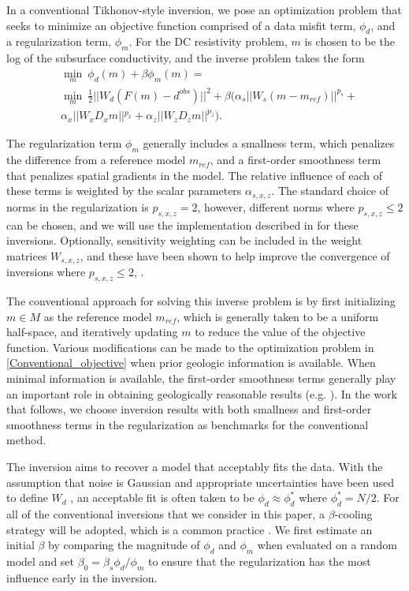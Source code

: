 \documentclass[lettersize,journal]{IEEEtran}
\begin{document}
In a conventional Tikhonov-style inversion, we pose an optimization problem that seeks to minimize an objective function comprised of a data misfit term, $\phi_d$, and a regularization term, $\phi_m$. For the DC resistivity problem, $m$ is chosen to be the log of the subsurface conductivity, and the inverse problem takes the form
\begin{equation}
\label{Conventional_objective}
\begin{aligned}
&\min_m \:\phi_d(m) + \beta\phi_m(m)= \\
&\min_m \:\frac{1}{2}||W_d(F(m) - d^{obs})||^2 + \beta (\alpha_s ||W_s(m-m_{ref})||^{p_s}+\\&\alpha_x \left||W_x D_x m\right||^{p_x}+\alpha_z \left||W_z D_z m\right||^{p_z}).
\end{aligned}
\end{equation}

The regularization term $\phi_m$ generally includes a smallness term, which penalizes the difference from a reference model $m_{ref}$, and a first-order smoothness term that penalizes spatial gradients in the model. The relative influence of each of these terms is weighted by the scalar parameters $\alpha_{s,x,z}$. The standard choice of norms in the regularization is $p_{s,x,z}=2$, however, different norms where $p_{s,x,z}\leq 2$ can be chosen, and we will use the implementation described in \cite{ref21} for these inversions. Optionally, sensitivity weighting can be included in the weight matrices $W_{s,x,z}$, and these have been shown to help improve the convergence of inversions where $p_{s,x,z}\leq 2$, \cite{ref21}.

The conventional approach for solving this inverse problem is by first initializing $m \in M$ as the reference model $m_{ref}$, which is generally taken to be a uniform half-space, and iteratively updating $m$ to reduce the value of the objective function. Various modifications can be made to the optimization problem in \ref{Conventional_objective} when prior geologic information is available. When minimal information is available, the first-order smoothness terms generally play an important role in obtaining geologically reasonable results (e.g. \cite{ref25}). In the work that follows, we choose inversion results with both smallness and first-order smoothness terms in the regularization as benchmarks for the conventional method. 

The inversion aims to recover a model that acceptably fits the data. With the assumption that noise is Gaussian and appropriate uncertainties have been used to define $W_d$ \cite{ref47}, an acceptable fit is often taken to be $\phi_d \approx \phi_d^* $ where $\phi_d^* = N/2$. For all of the conventional inversions that we consider in this paper, a $\beta$-cooling strategy will be adopted, which is a common practice \cite{ref47}. We first estimate an initial $\beta$ by comparing the magnitude of $\phi_d$ and $\phi_m$ when evaluated on a random model and set $\beta_0 = \beta_s \phi_d/\phi_m$ to ensure that the regularization has the most influence early in the inversion. 
\end{document}
